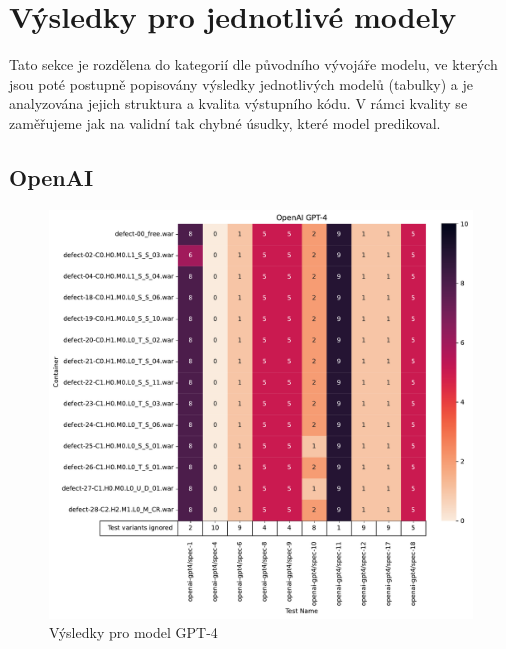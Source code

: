 \documentclass[czech, ma, kiv, he, iso690numb, pdf, viewonly]{fasthesis}
\begin{document}
    \section{Výsledky pro jednotlivé modely} \label{sec:results}

        Tato sekce je rozdělena do kategorií dle původního vývojáře modelu, ve kterých jsou poté postupně popisovány výsledky jednotlivých modelů (tabulky) a je analyzována jejich struktura a kvalita výstupního kódu. V rámci kvality se zaměřujeme jak na validní tak chybné úsudky, které model predikoval.
    
        \subsection{OpenAI} \label{sec:res:openai}

            \begin{figure}
                \includegraphics[width=\textwidth]{pic/gpt-4-results.pdf}
                \caption{Výsledky pro model GPT-4}
                \label{fig:res:gpt-4}
            \end{figure}
\end{document}
